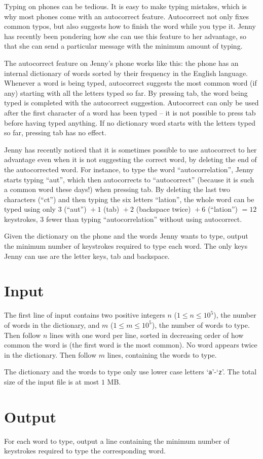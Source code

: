
%
Typing on phones can be tedious. It is easy to make typing mistakes,
which is why most phones come with an autocorrect feature.
Autocorrect not only fixes common typos, but also suggests how to
finish the word while you type it. Jenny has recently been pondering
how she can use this feature to her advantage, so that she can send a
particular message with the minimum amount of typing.

The autocorrect feature on Jenny's phone works like this: the phone has
an internal dictionary of words sorted by their frequency in the
English language. Whenever a word is being typed, autocorrect suggests
the most common word (if any) starting with all the letters typed so far.
By pressing tab, the word being typed is completed with the autocorrect suggestion.  Autocorrect can only be used after the first character of a word has been typed
-- it is not possible to press tab before having typed anything.  If no dictionary word starts with the letters typed so far, pressing tab has no effect.

Jenny has recently noticed that it is sometimes possible to use autocorrect to her advantage even
when it is not suggesting the correct word, by
deleting the end of the autocorrected word. For instance, to
type the word ``autocorrelation'', Jenny starts typing ``aut'', which then
autocorrects to ``autocorrect'' (because it is such a common word these
days!) when pressing tab. By deleting the last two characters (``ct'') and
then typing the six letters ``lation'', the whole word can be typed using only
$3$ (``aut'') ${}+1$ (tab) ${}+2$ (backspace twice)
${}+6$ (``lation'') $= 12$ keystrokes, $3$ fewer than typing
``autocorrelation'' without using autocorrect.

Given the dictionary on the phone and the words Jenny wants to type,
output the minimum number of keystrokes required to type each
word. The only keys Jenny can use are the letter keys, tab and backspace.

\section*{Input}

The first line of input contains two positive integers $n$ ($1 \le
n \le 10^5$), the number of words in the dictionary, and $m$ ($1 \le
m \le 10^5$), the number of words to type. Then follow $n$ lines with
one word per line, sorted in decreasing order of how common the word
is (the first word is the most common). No word appears twice in the
dictionary.  Then follow $m$ lines, containing the words to type.

The dictionary and the words to type only use lower case letters `\texttt{a}'-`\texttt{z}'.
The total size of the input file is at most $1$ MB.

\section*{Output}

For each word to type, output a line containing the minimum number of keystrokes required
to type the corresponding word.
